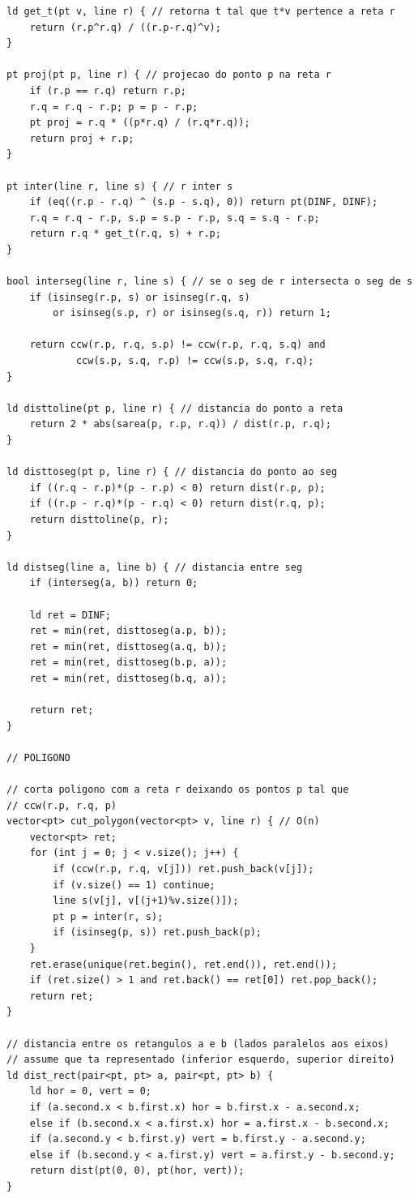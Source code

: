 \documentclass[9pt, a4paper, notitlepage]{extreport}
\begin{document}
\begin{multicols}{3}
\begin{verbatim}
ld get_t(pt v, line r) { // retorna t tal que t*v pertence a reta r
	return (r.p^r.q) / ((r.p-r.q)^v);
}

pt proj(pt p, line r) { // projecao do ponto p na reta r
	if (r.p == r.q) return r.p;
	r.q = r.q - r.p; p = p - r.p;
	pt proj = r.q * ((p*r.q) / (r.q*r.q));
	return proj + r.p;
}

pt inter(line r, line s) { // r inter s
	if (eq((r.p - r.q) ^ (s.p - s.q), 0)) return pt(DINF, DINF);
	r.q = r.q - r.p, s.p = s.p - r.p, s.q = s.q - r.p;
	return r.q * get_t(r.q, s) + r.p;
}

bool interseg(line r, line s) { // se o seg de r intersecta o seg de s
	if (isinseg(r.p, s) or isinseg(r.q, s)
		or isinseg(s.p, r) or isinseg(s.q, r)) return 1;

	return ccw(r.p, r.q, s.p) != ccw(r.p, r.q, s.q) and
			ccw(s.p, s.q, r.p) != ccw(s.p, s.q, r.q);
}

ld disttoline(pt p, line r) { // distancia do ponto a reta
	return 2 * abs(sarea(p, r.p, r.q)) / dist(r.p, r.q);
}

ld disttoseg(pt p, line r) { // distancia do ponto ao seg
	if ((r.q - r.p)*(p - r.p) < 0) return dist(r.p, p);
	if ((r.p - r.q)*(p - r.q) < 0) return dist(r.q, p);
	return disttoline(p, r);
}

ld distseg(line a, line b) { // distancia entre seg
	if (interseg(a, b)) return 0;

	ld ret = DINF;
	ret = min(ret, disttoseg(a.p, b));
	ret = min(ret, disttoseg(a.q, b));
	ret = min(ret, disttoseg(b.p, a));
	ret = min(ret, disttoseg(b.q, a));

	return ret;
}

// POLIGONO

// corta poligono com a reta r deixando os pontos p tal que 
// ccw(r.p, r.q, p)
vector<pt> cut_polygon(vector<pt> v, line r) { // O(n)
	vector<pt> ret;
	for (int j = 0; j < v.size(); j++) {
		if (ccw(r.p, r.q, v[j])) ret.push_back(v[j]);
		if (v.size() == 1) continue;
		line s(v[j], v[(j+1)%v.size()]);
		pt p = inter(r, s);
		if (isinseg(p, s)) ret.push_back(p);
	}
	ret.erase(unique(ret.begin(), ret.end()), ret.end());
	if (ret.size() > 1 and ret.back() == ret[0]) ret.pop_back();
	return ret;
}

// distancia entre os retangulos a e b (lados paralelos aos eixos)
// assume que ta representado (inferior esquerdo, superior direito)
ld dist_rect(pair<pt, pt> a, pair<pt, pt> b) {
	ld hor = 0, vert = 0;
	if (a.second.x < b.first.x) hor = b.first.x - a.second.x;
	else if (b.second.x < a.first.x) hor = a.first.x - b.second.x;
	if (a.second.y < b.first.y) vert = b.first.y - a.second.y;
	else if (b.second.y < a.first.y) vert = a.first.y - b.second.y;
	return dist(pt(0, 0), pt(hor, vert));
}


\end{verbatim}
\end{multicols}
\end{document}
